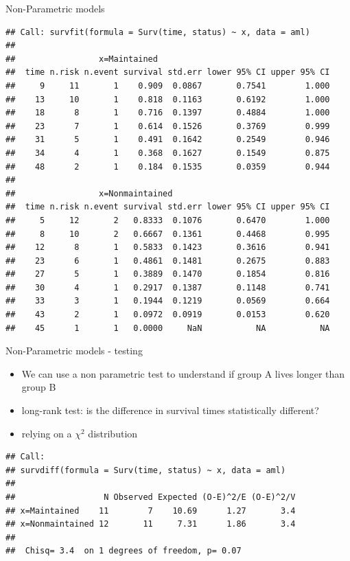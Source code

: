 \documentclass[
  ignorenonframetext,
]{beamer}
\begin{document}
\begin{frame}[fragile]{Non-Parametric models}
\protect\hypertarget{non-parametric-models-1}{}

\begin{verbatim}
## Call: survfit(formula = Surv(time, status) ~ x, data = aml)
## 
##                 x=Maintained 
##  time n.risk n.event survival std.err lower 95% CI upper 95% CI
##     9     11       1    0.909  0.0867       0.7541        1.000
##    13     10       1    0.818  0.1163       0.6192        1.000
##    18      8       1    0.716  0.1397       0.4884        1.000
##    23      7       1    0.614  0.1526       0.3769        0.999
##    31      5       1    0.491  0.1642       0.2549        0.946
##    34      4       1    0.368  0.1627       0.1549        0.875
##    48      2       1    0.184  0.1535       0.0359        0.944
## 
##                 x=Nonmaintained 
##  time n.risk n.event survival std.err lower 95% CI upper 95% CI
##     5     12       2   0.8333  0.1076       0.6470        1.000
##     8     10       2   0.6667  0.1361       0.4468        0.995
##    12      8       1   0.5833  0.1423       0.3616        0.941
##    23      6       1   0.4861  0.1481       0.2675        0.883
##    27      5       1   0.3889  0.1470       0.1854        0.816
##    30      4       1   0.2917  0.1387       0.1148        0.741
##    33      3       1   0.1944  0.1219       0.0569        0.664
##    43      2       1   0.0972  0.0919       0.0153        0.620
##    45      1       1   0.0000     NaN           NA           NA
\end{verbatim}

\end{frame}

\begin{frame}[fragile]{Non-Parametric models - testing}
\protect\hypertarget{non-parametric-models---testing}{}

\begin{itemize}
\item
  We can use a non parametric test to understand if group A lives longer
  than group B
\item
  long-rank test: is the difference in survival times statistically
  different?
\item
  relying on a \(\chi^2\) distribution
\end{itemize}

\begin{verbatim}
## Call:
## survdiff(formula = Surv(time, status) ~ x, data = aml)
## 
##                  N Observed Expected (O-E)^2/E (O-E)^2/V
## x=Maintained    11        7    10.69      1.27       3.4
## x=Nonmaintained 12       11     7.31      1.86       3.4
## 
##  Chisq= 3.4  on 1 degrees of freedom, p= 0.07
\end{verbatim}

\end{frame}
\end{document}
